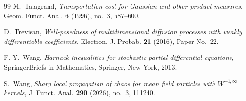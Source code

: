 \documentclass[11pt]{amsart}
\numberwithin{equation}{section}
\theoremstyle{plain}
\theoremstyle{remark}
\begin{document}
\begin{thebibliography}{99}
M.~Talagrand, \emph{Transportation cost for Gaussian and other product measures}, Geom. Funct. Anal. \textbf{6} (1996), no.~3, 587--600.

D.~Trevisan, \emph{Well-posedness of multidimensional diffusion processes with weakly differentiable coefficients}, Electron. J. Probab. \textbf{21} (2016), Paper No.~22.

F.-Y.~Wang, \emph{Harnack inequalities for stochastic partial differential equations}, SpringerBriefs in Mathematics, Springer, New York, 2013.

S.~Wang, \emph{Sharp local propagation of chaos for mean field particles with $W^{-1,\infty}$ kernels}, J. Funct. Anal. \textbf{290} (2026), no.~3, 111240.

\end{thebibliography}
\end{document}
